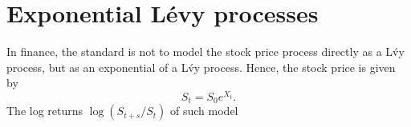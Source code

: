 \section{Exponential L\'evy processes}
\label{sec:Levy:exponential_processes}

In finance, the standard is not to model the stock price process directly as a L\'vy process, but as an exponential of a L\'vy process. Hence, the stock price is given by
$$S_t = S_0 e^{X_t}.$$
The log returns $\log(S_{t+s}/S_t)$ of such model 

 

